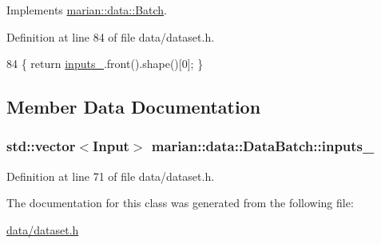 Implements \hyperlink{classmarian_1_1data_1_1Batch_a94c7526a079220adb07575e302c670c4}{marian\+::data\+::\+Batch}.



Definition at line 84 of file data/dataset.\+h.


\begin{DoxyCode}
84 \{ \textcolor{keywordflow}{return} \hyperlink{classmarian_1_1data_1_1DataBatch_a9cb518e76d76f64176f6f73ed1476115}{inputs\_}.front().shape()[0]; \}
\end{DoxyCode}


\subsection{Member Data Documentation}
\subsubsection[{\texorpdfstring{inputs\+\_\+}{inputs_}}]{\setlength{\rightskip}{0pt plus 5cm}std\+::vector$<${\bf Input}$>$ marian\+::data\+::\+Data\+Batch\+::inputs\+\_\+\hspace{0.3cm}{\ttfamily [private]}}\hypertarget{classmarian_1_1data_1_1DataBatch_a9cb518e76d76f64176f6f73ed1476115}{}\label{classmarian_1_1data_1_1DataBatch_a9cb518e76d76f64176f6f73ed1476115}


Definition at line 71 of file data/dataset.\+h.



The documentation for this class was generated from the following file\+:\begin{DoxyCompactItemize}
\item 
\hyperlink{data_2dataset_8h}{data/dataset.\+h}\end{DoxyCompactItemize}
